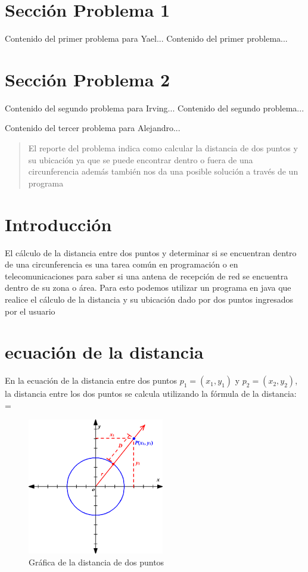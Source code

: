 \documentclass{IEEEcsmag}
\begin{document}
\section{Sección Problema 1}
Contenido del primer problema para Yael...
\newpage
Contenido del primer problema...
\newpage


\section{Sección Problema 2}
Contenido del segundo problema para Irving...
\newpage
Contenido del segundo problema...
\newpage


Contenido del tercer problema para Alejandro...
\newpage 
\begin{abstract}
    
    El reporte del problema indica como calcular la distancia de dos puntos y su ubicación ya que se puede encontrar dentro o fuera de una circunferencia además también nos da una posible solución a través de un programa 
\end{abstract}


\section{Introducción}
El cálculo de la distancia entre dos puntos y determinar si se encuentran dentro de una circunferencia es una tarea común en programación o en telecomunicaciones para saber si una antena de recepción de red se encuentra dentro de su zona o área. Para esto podemos utilizar un programa en java que realice el cálculo de la distancia y su ubicación dado por dos puntos ingresados por el usuario 
\section{ecuación de la distancia}
En la ecuación de la distancia entre dos puntos $p_1 = (x_1, y_1)$ y $p_2 = (x_2, y_2)$, la distancia entre los dos puntos se calcula utilizando la fórmula de la distancia:
 = 

\begin{figure}[h!]
    \centering
    \includegraphics[width = 6 cm]{latex-imagenes/imagen7.png}
    \caption{Gráfica de la distancia de dos puntos}
    \label{fig:Grafica de la distancia de dos puntos }
\end{figure}
\end{document}
